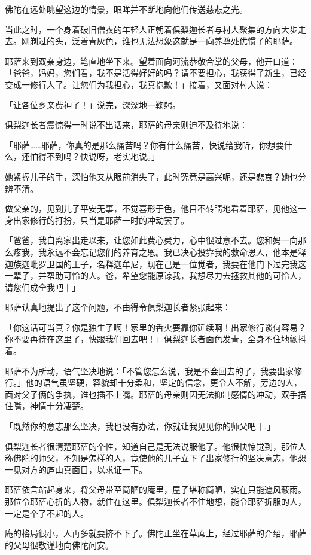 \documentclass[twoside,openany]{book}
\begin{document}
佛陀在远处眺望这边的情景，眼眸并不断地向他们传送慈悲之光。

当此之时，一个身着破旧僧衣的年轻人正朝着俱梨迦长者与村人聚集的方向大步走去。刚剃过的头，泛着青灰色，谁也无法想象这就是一向养尊处优惯了的耶萨。

耶萨来到双亲身边，笔直地坐下来。望着面向河流恭敬合掌的父母，他开口道：「爸爸，妈妈，您们看，我不是活得好好的吗？请不要担心，我获得了新生，已经变成一修行人了。让您们为我担心，我真抱歉！」接着，又面对村人说：

「让各位乡亲费神了！」说完，深深地一鞠躬。

俱梨迦长者震惊得一时说不出话来，耶萨的母亲则迫不及待地说：

「耶萨……耶萨，你真的是那么痛苦吗？你有什么痛苦，快说给我听，你想要什么，还怕得不到吗？快说呀，老实地说。」

她紧握儿子的手，深怕他又从眼前消失了，此时究竟是高兴呢，还是悲哀？她也分辨不清。

做父亲的，见到儿子平安无事，不觉喜形于色，他目不转睛地看着耶萨，见他这一身出家修行的打扮，只当是耶萨一时的冲动罢了。

「爸爸，我自离家出走以来，让您如此费心费力，心中很过意不去。您和妈一向那么疼我，我永远不会忘记您们的养育之恩。我已决心投靠我的救命恩人，他本是释迦族迦毗罗卫国的王子，名释迦牟尼，现在己是一位觉者，我要在他门下过完我这一辈子，并帮助可怜的人。爸，希望您能原谅我，我想尽力去拯救其他的可怜人，请您们成全我吧丨」

耶萨认真地提出了这个问题，不由得令俱梨迦长者紧张起来：

「你这话可当真？你是独生子啊！家里的香火要靠你延续啊！出家修行谈何容易？你不要再待在这里了，快跟我们回去吧！」俱梨迦长者面色发青，全身不住地颤抖着。

耶萨不为所动，语气坚决地说：「不管您怎么说，我是不会回去的了，我要出家修行。」他的语气虽坚硬，容貌却十分柔和，坚定的信念，更令人不解，旁边的人，面对父子俩的争执，谁也插不上嘴。耶萨的母亲则因无法抑制感情的冲动，双手捂住嘴，神情十分凄楚。

「既然你的意志那么坚决，我也没有办法，你就让我见见你的师父吧丨.」

俱梨迦长者很清楚耶萨的个性，知道自己是无法说服他了。他很快惊觉到，那位人称佛陀的师父，不知是怎样的人，竟使他的儿子立下了出家修行的坚决意志，他想一见对方的庐山真面目，以求证一下。

耶萨依言站起身来，将父母带至简陋的庵里，屋子堪称简陋，实在只能遮风蔽雨。那位令耶萨心折的人物，就住在这里。俱梨迦长者不住地想，能令耶萨折服的人，一定是个了不起的人。

庵的格局很小，人再多就要挤不下了。佛陀正坐在草蓆上，经过耶萨的介绍，耶萨的父母很敬谨地向佛陀问安。
\end{document}
